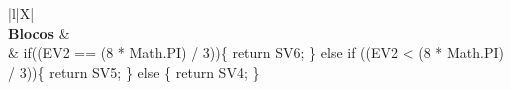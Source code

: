 \begin{xltabular}{\textwidth}{|l|X|}
		 \\ \hline
		\textbf{Blocos} &  \\ \hline
		 & if((EV2 == (8 * Math.PI) / 3))\{   return SV6; \} else if ((EV2 < (8 * Math.PI) / 3))\{   return SV5; \} else \{   return SV4; \} \\ \hline



\end{xltabular}
